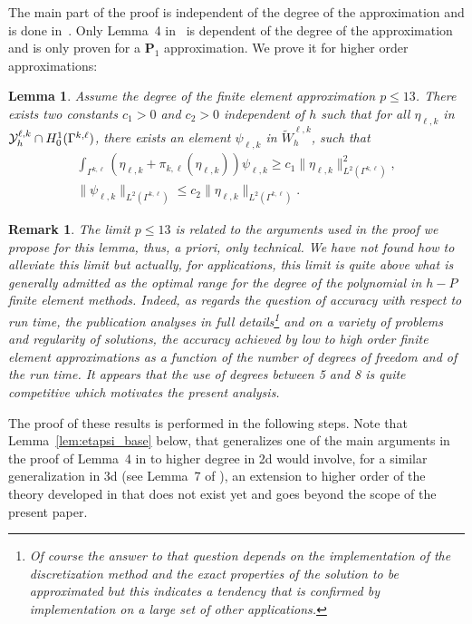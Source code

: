 \documentclass[final]{siamltex}
\newtheorem{lem}{Lemma}
\newtheorem{rem}{Remark}
\begin{document}
The main part of the proof is independent of the degree of the
approximation and is done in~\cite{JMN10}.
Only Lemma~4 in~\cite{JMN10} is dependent of the degree of the approximation and is only proven for
a ${\mathbf{P}}_1$ approximation. We prove it for higher order approximations:
\begin{lem}\label{lem_1}
Assume the degree of the finite element approximation $p\le 13$. There
exists two constants $c_1>0$ and $c_2>0$ independent of $h$
such that for all
$\eta_{\ell,k}$ in
${\cal Y}_h^{\ell,k}\cap H_0^1(\Gamma^{k,\ell})$, there exists an element
$\psi_{\ell,k}$ in
$\tilde W_h^{\ell,k}$,   such that
\begin{eqnarray}
\label{injectif}
\int_{\Gamma^{k,\ell}}(\eta_{\ell,k}+\pi_{k,\ell}(\eta_{\ell,k}))\psi_{\ell,k}
\ge c_1\|\eta_{\ell,k} \|_{L^2(\Gamma^{k,\ell})}^2,\\
\label{stable}
\| \psi_{\ell,k} \|_{L^2(\Gamma^{k,\ell})} \le
c_2 \| \eta_{\ell,k} \|_{L^2(\Gamma^{k,\ell})}.
\end{eqnarray}
\end{lem}
\begin{rem}
The limit $p\le 13$ is related to the arguments used in the proof we propose for this lemma,
thus, a priori, only technical. We have not found how to alleviate
this limit but actually, for applications, this limit is quite above
what is generally admitted as the optimal range for the degree of the
polynomial in $h-P$ finite element methods. Indeed, as regards the question of
accuracy with respect to run time, the publication \cite{Vos} analyses in
full details\footnote{Of course the answer to that question depends on
the implementation of the discretization method and the exact
properties of the solution to be approximated but this indicates a
tendency that is confirmed by implementation on a large set of other
applications.} and on a variety of problems and regularity of
solutions, the accuracy achieved by low to high order finite element
approximations as a function of the number of degrees of freedom and
of the run time. It appears that the use of degrees between 5 and 8 is
quite competitive which motivates the present analysis.  
\end{rem}

The proof of these results is performed in the following steps.
Note that Lemma~\ref{lem:etapsi_base} below, that generalizes one of the main arguments in the proof of
Lemma~4 in \cite{JMN10} to higher degree in 2d would involve, for a similar generalization in 3d
(see Lemma~7 of \cite{JMN10}), an extension to higher order of the theory developed in \cite{BraessDahmen} that does not
exist yet and goes beyond the scope of the present paper.
\end{document}
